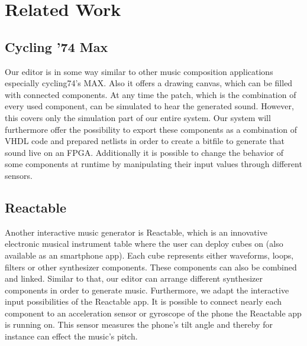 \chapter{Related Work}
\label{chapter:RelatedWork}
	 
\section{Cycling '74 Max}
	Our editor is in some way similar to other music composition applications especially cycling74's MAX. Also it offers a drawing canvas, which can be filled with connected components. At any time the patch, which is the combination of every used component, can be simulated to hear the generated sound. However, this covers only the simulation part of our entire system.
	Our system will furthermore offer the possibility to export these components as a combination of VHDL code and prepared netlists in order to create a bitfile to generate that sound live on an \ac{FPGA}. Additionally it is possible to change the behavior of some components at runtime by manipulating their input values through different sensors. 

\section{Reactable}

Another interactive music generator is Reactable, which is an innovative electronic musical instrument table where the user can deploy cubes on (also available as an smartphone app). Each cube represents either waveforms, loops, filters or other synthesizer components. These components can also be combined and linked. Similar to that, our editor can arrange different synthesizer components in order to generate music. Furthermore, we adapt the interactive input possibilities of the Reactable app. It is possible to connect nearly each component to an acceleration sensor or gyroscope of the phone the Reactable app is running on. This sensor measures the phone's tilt angle and thereby for instance can effect the music's pitch.